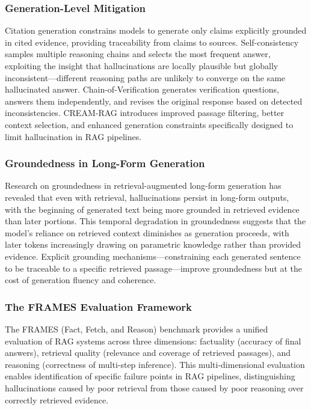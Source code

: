 \documentclass[11pt,letterpaper]{article}
\begin{document}
\subsubsection{Generation-Level Mitigation}

Citation generation \cite{gao2023enabling} constrains models to generate only claims explicitly grounded in cited evidence, providing traceability from claims to sources. Self-consistency \cite{wang2023selfconsistency} samples multiple reasoning chains and selects the most frequent answer, exploiting the insight that hallucinations are locally plausible but globally inconsistent---different reasoning paths are unlikely to converge on the same hallucinated answer. Chain-of-Verification \cite{dhuliawala2023chain} generates verification questions, answers them independently, and revises the original response based on detected inconsistencies. CREAM-RAG introduces improved passage filtering, better context selection, and enhanced generation constraints specifically designed to limit hallucination in RAG pipelines.

\subsubsection{Groundedness in Long-Form Generation}

Research on groundedness in retrieval-augmented long-form generation has revealed that even with retrieval, hallucinations persist in long-form outputs, with the beginning of generated text being more grounded in retrieved evidence than later portions. This temporal degradation in groundedness suggests that the model's reliance on retrieved context diminishes as generation proceeds, with later tokens increasingly drawing on parametric knowledge rather than provided evidence. Explicit grounding mechanisms---constraining each generated sentence to be traceable to a specific retrieved passage---improve groundedness but at the cost of generation fluency and coherence.

\subsubsection{The FRAMES Evaluation Framework}

The FRAMES (Fact, Fetch, and Reason) benchmark provides a unified evaluation of RAG systems across three dimensions: factuality (accuracy of final answers), retrieval quality (relevance and coverage of retrieved passages), and reasoning (correctness of multi-step inference). This multi-dimensional evaluation enables identification of specific failure points in RAG pipelines, distinguishing hallucinations caused by poor retrieval from those caused by poor reasoning over correctly retrieved evidence.
\end{document}
